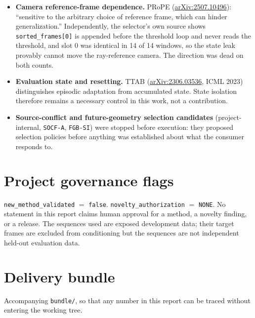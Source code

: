 \documentclass[11pt,a4paper]{article}
\newcommand{\arxiv}[1]{\href{https://arxiv.org/abs/#1}{arXiv:#1}}
\newcommand{\code}[1]{\texttt{\small #1}}
\begin{document}
\begin{itemize}
\item \textbf{Camera reference-frame dependence.} PRoPE (\arxiv{2507.10496}): ``sensitive to the
arbitrary choice of reference frame, which can hinder generalization.'' Independently, the selector's
own source shows \code{sorted\_frames[0]} is appended before the threshold loop and never reads the
threshold, and slot 0 was identical in 14 of 14 windows, so the state leak provably cannot move the
ray-reference camera. The direction was dead on both counts.
\item \textbf{Evaluation state and resetting.} TTAB (\arxiv{2306.03536}, ICML 2023) distinguishes
episodic adaptation from accumulated state. State isolation therefore remains a necessary control in
this work, not a contribution.
\item \textbf{Source-conflict and future-geometry selection candidates} (project-internal,
\code{SOCF-A}, \code{FGB-SI}) were stopped before execution: they proposed selection policies before
anything was established about what the consumer responds to.
\end{itemize}

\section{Project governance flags}

\code{new\_method\_validated} $=$ \code{false}. \code{novelty\_authorization} $=$ \code{NONE}. No
statement in this report claims human approval for a method, a novelty finding, or a release. The
sequences used are exposed development data; their target frames are excluded from conditioning but
the sequences are not independent held-out evaluation data.

\section{Delivery bundle}

Accompanying \code{bundle/}, so that any number in this report can be traced without entering the
working tree.
\end{document}
